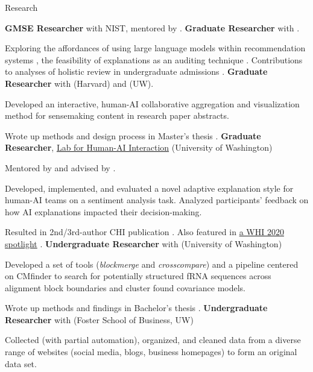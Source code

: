 \begin{rubric}{Research}

	\textbf{GMSE Researcher} with NIST, mentored by \pSextonT{}.
	\textbf{Graduate Researcher} with \pJoachimsT{}.
	\par Exploring the affordances of using large language models within recommendation systems \cite{gaoEndToEnd2024, zhouLanguageBasedUser2024, zhouGPTBaselineRecommendation2023}, the feasibility of explanations as an auditing technique \cite{zhouHowExplainJustify2023, zhou2022how}. Contributions to analyses of holistic review in undergraduate admissions \cite{leeEndingAffirmativeAction2024, leeAugmentingHolisticReview2023}.
\entry*[2020 -- 2021] %
	\textbf{Graduate Researcher} with \pGlassmanE{} (Harvard) and \pWeldD{} (UW).
	\par Developed an interactive, human-AI collaborative aggregation and visualization method for sensemaking content in research paper abstracts.
	\par Wrote up methods and design process in Master's thesis \cite{zhou2021thesis}.
\entry*[2019 -- 2021] %
	\textbf{Graduate Researcher}, \href{http://hai.cs.washington.edu}{Lab for Human-AI Interaction} (University of Washington)
	\par Mentored by \pBansalG{} and advised by \pWeldD{}.
	\par Developed, implemented, and evaluated a novel adaptive explanation style for human-AI teams on a sentiment analysis task. Analyzed participants' feedback on how AI explanations impacted their decision-making.
	\par Resulted in 2nd/3rd-author CHI publication \cite{bansal2021does}. Also featured in \href{https://sites.google.com/view/whi2020/home}{a WHI 2020 spotlight} \cite{bansal2020does}.
\entry*[2018 -- 2019] %
    \textbf{Undergraduate Researcher} with \pRuzzoL{} (University of Washington)
    \par Developed a set of tools (\textit{blockmerge} and \textit{crosscompare}) and a pipeline centered on CMfinder to search for potentially structured fRNA sequences across alignment block boundaries and cluster found covariance models.
    \par Wrote up methods and findings in Bachelor's thesis \cite{zhou2019thesis}.
\entry*[2018 -- 2019] %
	\textbf{Undergraduate Researcher} with \pPahnkeE{} (Foster School of Business, UW)
	\par Collected (with partial automation), organized, and cleaned data from a diverse range of websites (social media, blogs, business homepages) to form an original data set.
\end{rubric}